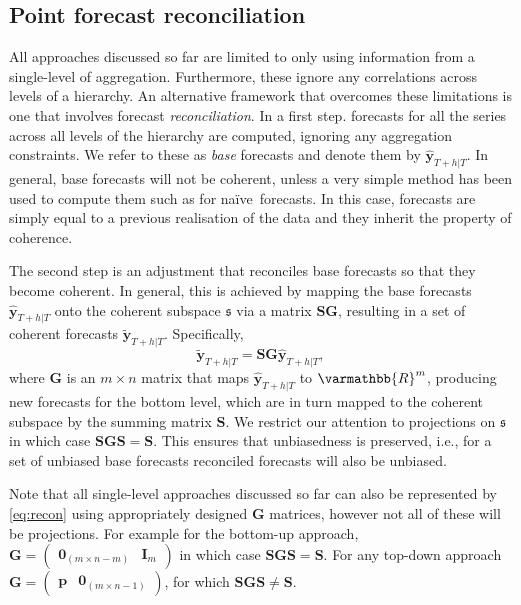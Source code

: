 \documentclass[graybox]{svmult}
\def\naive{na\"{i}ve\ }
\begin{document}
\subsection{Point forecast reconciliation}\label{sec:reconciliation approaches}

All approaches discussed so far are limited to only using information from a single-level of aggregation. Furthermore, these ignore any correlations across levels of a hierarchy. An alternative framework that overcomes these limitations is one that involves forecast \textit{reconciliation}. In a first step. forecasts for all the series across all levels of the hierarchy are computed, ignoring any aggregation constraints. We refer to these as \textit{base} forecasts and denote them by $\hat{\bm{y}}_{T+h|T}$. In general, base forecasts will not be coherent, unless a very simple method has been used to compute them such as for \naive forecasts. In this case, forecasts are simply equal to a previous realisation of the data and they inherit the property of coherence.

The second step is an adjustment that reconciles base forecasts so that they become coherent. In general, this is achieved by mapping the base forecasts $\hat{\bm{y}}_{T+h|T}$ onto the coherent subspace $\mathfrak{s}$ via a matrix $\bm{S}\bm{G}$, resulting in a set of coherent forecasts $\tilde{\bm{y}}_{T+h|T}$. Specifically,
\begin{equation}\label{eq:recon}
	\tilde{\bm{y}}_{T+h|T}=\bm{S}\bm{G}\hat{\bm{y}}_{T+h|T},
\end{equation}
where $\bm{G}$ is an $m\times n$ matrix that maps $\hat{\bm{y}}_{T+h|T}$ to $\varmathbb{R}^m$, producing new forecasts for the bottom level, which are in turn mapped to the coherent subspace by the summing matrix $\bm{S}$. We restrict our attention to projections on $\mathfrak{s}$ in which case $\bm{S}\bm{G}\bm{S}=\bm{S}$. This ensures that unbiasedness is preserved, i.e., for a set of unbiased base forecasts reconciled forecasts will also be unbiased.

Note that all single-level approaches discussed so far can also be represented by \eqref{eq:recon} using appropriately designed $\bm{G}$ matrices, however not all of these will be projections. For example for the bottom-up approach, $\bm{G}=\begin{pmatrix}
		\bm{0}_{(m \times n-m)} & \bm{I}_m
	\end{pmatrix}$ in which case $\bm{S}\bm{G}\bm{S}=\bm{S}$. For any top-down approach
$\bm{G}=\begin{pmatrix}
		\bm{p} & \bm{0}_{(m \times n-1)}
	\end{pmatrix}$, for which $\bm{S}\bm{G}\bm{S}\ne\bm{S}$.
\end{document}
